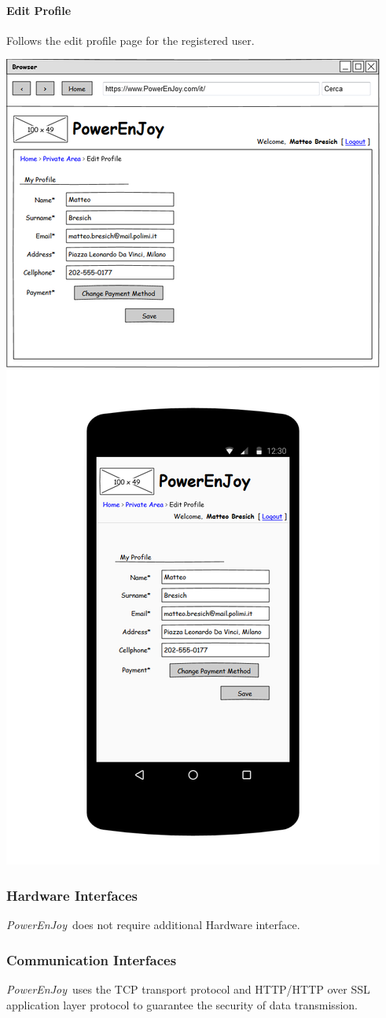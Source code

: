 \documentclass{article}
\newcommand{\pej}{\mbox{\normalfont\itshape PowerEnJoy }}
\begin{document}
			\paragraph{Edit Profile} Follows the edit profile page for the registered user.
			\begin{center}
				\includegraphics[width=0.6\linewidth]{"img/ui/edit-profile"}
			\end{center}
			\pagebreak
		
			\subsubsection{Hardware Interfaces}
			\pej does not require additional Hardware interface.
			\subsubsection{Communication Interfaces}
			\pej uses the TCP transport protocol and HTTP/HTTP over SSL application layer protocol to guarantee the security of data transmission.
			
\end{document}
